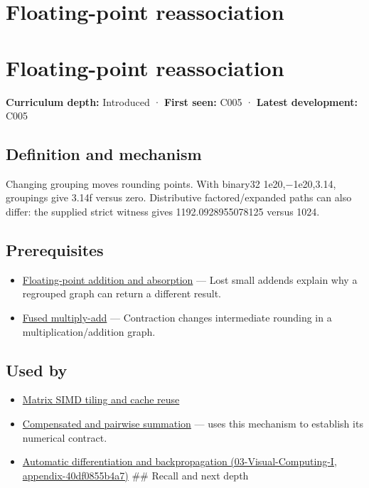 \hypertarget{appendix-c2ac4a84c283}{}
\section*{Floating-point reassociation}
\section{Floating-point reassociation}\label{floating-point-reassociation}

\textbf{Curriculum depth:} Introduced · \textbf{First seen:} C005 · \textbf{Latest development:} C005

\subsection{Definition and mechanism}\label{definition-and-mechanism}

Changing grouping moves rounding points. With binary32 1e20,−1e20,3.14, groupings give 3.14f versus zero. Distributive factored/expanded paths can also differ: the supplied strict witness gives 1192.0928955078125 versus 1024.

\subsection{Prerequisites}\label{prerequisites}

\begin{itemize}
\tightlist
\item
  \hyperref[appendix-a1b1b4580dfd]{Floating-point addition and absorption} --- Lost small addends explain why a regrouped graph can return a different result.
\item
  \hyperref[appendix-41e8ef22a21e]{Fused multiply-add} --- Contraction changes intermediate rounding in a multiplication/addition graph.
\end{itemize}

\subsection{Used by}\label{used-by}

\begin{itemize}
\item
  \hyperref[appendix-1bfb7c657105]{Matrix SIMD tiling and cache reuse}
\item
  \hyperref[appendix-df318da57389]{Compensated and pairwise summation} --- uses this mechanism to establish its numerical contract.
\item
  \href{}{Automatic differentiation and backpropagation (03-Visual-Computing-I, appendix-40df0855b4a7)} \#\# Recall and next depth
\end{itemize}

